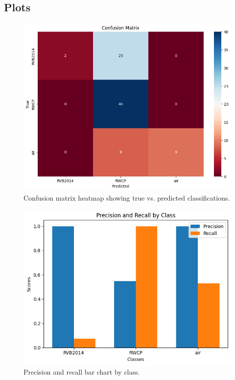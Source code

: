 \documentclass{article}
\begin{document}
\subsection{Plots}
\begin{figure}[H] %
\centering
\includegraphics[width=\textwidth]{confusion_matrix.png}
\caption{Confusion matrix heatmap showing true vs. predicted classifications.}
\label{fig:confusion_matrix}
\end{figure}

\begin{figure}[H] %
\centering
\includegraphics[width=\textwidth]{precision_recall.png}
\caption{Precision and recall bar chart by class.}
\label{fig:precision_recall}
\end{figure}
\end{document}
